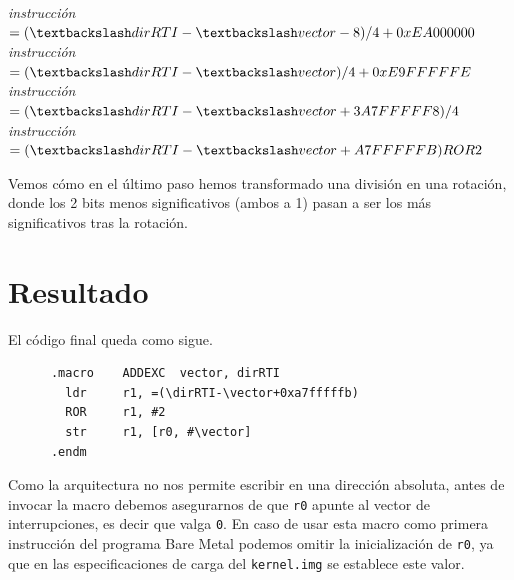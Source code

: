 {\it instrucción }$ = (\textbackslash dirRTI-\textbackslash vector-8)/4 + 0xEA000000$ \\
{\it instrucción }$ = (\textbackslash dirRTI-\textbackslash vector)/4 + 0xE9FFFFFE$ \\
{\it instrucción }$ = (\textbackslash dirRTI-\textbackslash vector+3A7FFFFF8)/4$ \\
{\it instrucción }$ = (\textbackslash dirRTI-\textbackslash vector+A7FFFFFB) ROR 2$

Vemos cómo en el último paso hemos transformado una división en una rotación, donde los
2 bits menos significativos (ambos a 1) pasan a ser los más significativos tras la
rotación.

\section{Resultado}

El código final queda como sigue.

\begin{lstlisting}
      .macro    ADDEXC  vector, dirRTI
        ldr     r1, =(\dirRTI-\vector+0xa7fffffb)
        ROR     r1, #2
        str     r1, [r0, #\vector]
      .endm
\end{lstlisting}

Como la arquitectura no nos permite escribir en una dirección absoluta, antes
de invocar la macro debemos asegurarnos de que {\tt r0} apunte al vector de
interrupciones, es decir que valga {\tt 0}. En caso de usar esta macro como
primera instrucción del programa Bare Metal podemos omitir la inicialización
de {\tt r0}, ya que en las especificaciones de carga del {\tt kernel.img} se
establece este valor.

\chapterend
